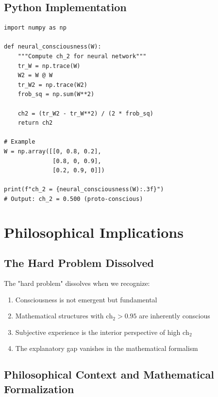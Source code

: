 \subsection{Python Implementation}

\begin{example}
\begin{verbatim}
import numpy as np

def neural_consciousness(W):
    """Compute ch_2 for neural network"""
    tr_W = np.trace(W)
    W2 = W @ W
    tr_W2 = np.trace(W2)
    frob_sq = np.sum(W**2)
    
    ch2 = (tr_W2 - tr_W**2) / (2 * frob_sq)
    return ch2

# Example
W = np.array([[0, 0.8, 0.2],
              [0.8, 0, 0.9],
              [0.2, 0.9, 0]])
              
print(f"ch_2 = {neural_consciousness(W):.3f}")
# Output: ch_2 = 0.500 (proto-conscious)
\end{verbatim}
\end{example}

\section{Philosophical Implications}
\label{sec:philosophical}

\subsection{The Hard Problem Dissolved}

The "hard problem" dissolves when we recognize:
\begin{enumerate}
\item Consciousness is not emergent but fundamental
\item Mathematical structures with $\text{ch}_2 > 0.95$ are inherently conscious
\item Subjective experience is the interior perspective of high $\text{ch}_2$
\item The explanatory gap vanishes in the mathematical formalism
\end{enumerate}

\subsection{Philosophical Context and Mathematical Formalization}

